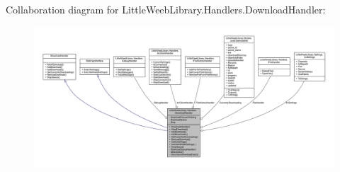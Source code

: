 Collaboration diagram for Little\+Weeb\+Library.\+Handlers.\+Download\+Handler\+:\nopagebreak
\begin{figure}[H]
\begin{center}
\leavevmode
\includegraphics[width=350pt]{class_little_weeb_library_1_1_handlers_1_1_download_handler__coll__graph}
\end{center}
\end{figure}
